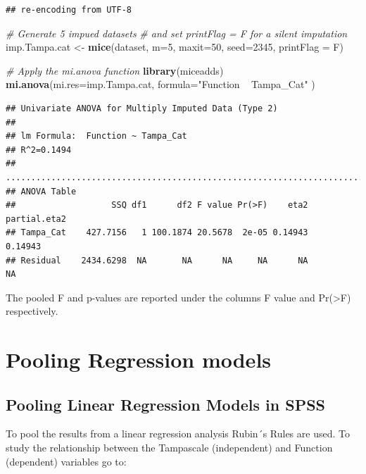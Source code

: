 \documentclass[]{book}
\newenvironment{Shaded}{\begin{snugshade}}{\end{snugshade}}
\newcommand{\KeywordTok}[1]{\textcolor[rgb]{0.13,0.29,0.53}{\textbf{#1}}}
\newcommand{\DataTypeTok}[1]{\textcolor[rgb]{0.13,0.29,0.53}{#1}}
\newcommand{\DecValTok}[1]{\textcolor[rgb]{0.00,0.00,0.81}{#1}}
\newcommand{\StringTok}[1]{\textcolor[rgb]{0.31,0.60,0.02}{#1}}
\newcommand{\CommentTok}[1]{\textcolor[rgb]{0.56,0.35,0.01}{\textit{#1}}}
\newcommand{\NormalTok}[1]{#1}
\begin{document}
\begin{verbatim}
## re-encoding from UTF-8
\end{verbatim}

\begin{Shaded}
\begin{Highlighting}[]
\CommentTok{# Generate 5 impued datasets }
\CommentTok{# and set printFlag = F for a silent imputation}
\NormalTok{imp.Tampa.cat <-}\StringTok{ }\KeywordTok{mice}\NormalTok{(dataset, }\DataTypeTok{m=}\DecValTok{5}\NormalTok{, }\DataTypeTok{maxit=}\DecValTok{50}\NormalTok{, }\DataTypeTok{seed=}\DecValTok{2345}\NormalTok{, }\DataTypeTok{printFlag =}\NormalTok{ F)}

\CommentTok{# Apply the mi.anova function}
\KeywordTok{library}\NormalTok{(miceadds)}
\KeywordTok{mi.anova}\NormalTok{(}\DataTypeTok{mi.res=}\NormalTok{imp.Tampa.cat, }\DataTypeTok{formula=}\StringTok{"Function ~ Tampa_Cat"}\NormalTok{ )}
\end{Highlighting}
\end{Shaded}

\begin{verbatim}
## Univariate ANOVA for Multiply Imputed Data (Type 2)  
## 
## lm Formula:  Function ~ Tampa_Cat
## R^2=0.1494 
## ..........................................................................
## ANOVA Table 
##                   SSQ df1      df2 F value Pr(>F)    eta2 partial.eta2
## Tampa_Cat    427.7156   1 100.1874 20.5678  2e-05 0.14943      0.14943
## Residual    2434.6298  NA       NA      NA     NA      NA           NA
\end{verbatim}

The pooled F and p-values are reported under the columns F value and
Pr(\textgreater{}F) respectively.

\section{Pooling Regression models}\label{pooling-regression-models}

\subsection{Pooling Linear Regression Models in
SPSS}\label{pooling-linear-regression-models-in-spss}

To pool the results from a linear regression analysis Rubin´s Rules are
used. To study the relationship between the Tampascale (independent) and
Function (dependent) variables go to:
\end{document}
